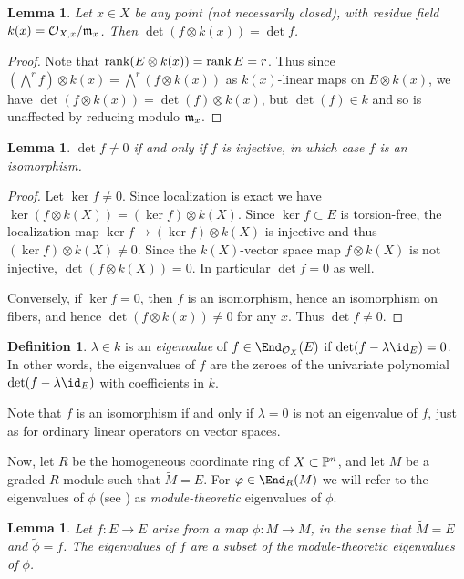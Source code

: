 \documentclass[12pt]{article}
\let\wtilde\widetilde
\def\OO{\mathcal O}
\theoremstyle{theorem}
\numberwithin{thm}{section}
\newtheorem{lem}[thm]{Lemma}
\theoremstyle{definition}
\newtheorem{dfn}[thm]{Definition}
\def\defn#1{{\it #1}}
\begin{document}
\begin{lem}
  Let $x \in X$ be any point (not necessarily closed), with residue field $k(x) = \OO_{X,x}/\m_x$. Then $\det(f\otimes k(x)) =\det f$.
\end{lem}
\begin{proof}
  Note that $\rank( E\otimes k(x)) = \rank E = r$. Thus since $(\bigwedge^r f)\otimes k(x) = \bigwedge^r( f\otimes k(x))$ as $k(x)$-linear maps on $E\otimes k(x)$,
  we have $\det(f\otimes k(x)) =\det(f)\otimes k(x)$, but $\det(f)\in k$ and so is unaffected by reducing modulo $\m_x$.
\end{proof}

\begin{lem}
  $\det f \neq 0 $ if and only if $f$ is injective, in which case $f$ is an isomorphism.
\end{lem}
\begin{proof}
  Let $\ker f \neq 0$. Since localization is exact we have $\ker(f\otimes k(X)) = (\ker f)\otimes k(X)$.  Since $\ker f \subset E$ is torsion-free, the localization map $\ker f \to (\ker f)\otimes k(X)$ is injective and thus $(\ker f) \otimes k(X)\neq 0$. Since the $k(X)$-vector space map $f\otimes k(X)$ is not injective, $\det(f\otimes k(X))= 0$. In particular  $\det f = 0$ as well.

  Conversely, if $\ker f = 0$, then $f$ is an isomorphism, hence an isomorphism on fibers, and hence $\det(f\otimes k(x)) \neq 0$ for any $x$. Thus $\det f\neq 0$.
\end{proof}

\begin{dfn}
  $\lambda \in k$ is an \defn{eigenvalue} of $f \in \End_{\OO_X}(E)$ if $\det(f-\lambda \id_E)= 0$. In other words, the eigenvalues of $f$ are the zeroes of the univariate polynomial $\det(f - \lambda\id _E)$ with coefficients in $k$.
\end{dfn}

Note that $f$ is an isomorphism if and only if $\lambda=0$ is not an eigenvalue of $f$, just as for ordinary linear operators on vector spaces.

Now, let $R$ be the homogeneous coordinate ring of $X\subset \P^n$, and let $M$ be a graded $R$-module such that $\wtilde M=E$. For $\phi\in\End_R(M)$ we will refer to the eigenvalues of $\phi$ (see ) as \emph{module-theoretic} eigenvalues of $\phi$.

\begin{lem}
  Let $f\colon E\to E$ arise from a map $\phi\colon M\to M$, in the sense that $\wtilde M = E$ and $\wtilde\phi = f$. The eigenvalues of $f$ are a subset of the module-theoretic eigenvalues of $\phi$.
\end{lem}
\end{document}
